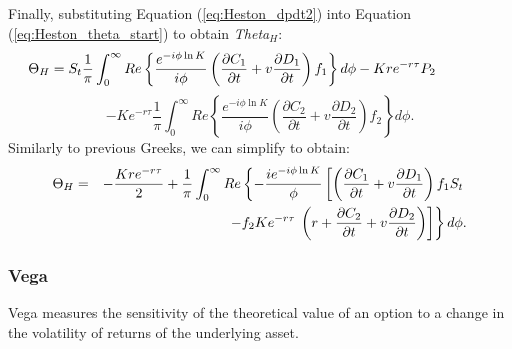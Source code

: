 \documentclass[a4paper]{article}
\begin{document}
Finally, substituting Equation (\ref{eq:Heston_dpdt2}) into Equation (\ref{eq:Heston_theta_start}) to obtain \textit{Theta$_H$}:
\begin{equation*}
	\hspace{-40pt} \Theta_H = S_t \frac{1}{\pi}\int_0^{\infty} Re \left\{ \frac{e^{-i\phi \ln K}}{i\phi} \left( \frac{\partial C_1}{\partial t} + v\frac{\partial D_1}{\partial t} \right) f_1 \right\} d\phi - Kre^{-r\tau}P_2
\end{equation*}
\begin{equation}
	- Ke^{-r\tau} \frac{1}{\pi}\int_0^{\infty} Re \left\{ \frac{e^{-i\phi \ln K}}{i\phi} \left( \frac{\partial C_2}{\partial t} + v\frac{\partial D_2}{\partial t} \right) f_2 \right\} d\phi.
\end{equation}
Similarly to previous Greeks, we can simplify to obtain:
\begin{eqnarray}
	\Theta_H &  = & -\frac{Kre^{-r\tau}}{2} +\frac{1}{\pi} \int_0^\infty Re \left\{-\frac{ie^{-i\phi \ln K}}{\phi} \left[ \left( \frac{\partial C_1}{\partial t} + v\frac{\partial D_1}{\partial t} \right ) f_1S_t\right. \right. \notag\\
	&  & - f_2Ke^{-r\tau}\left. \left.  \left(r + \frac{\partial C_2}{\partial t} + v\frac{\partial D_2}{\partial t} \right ) \right] \right\} d\phi.
\end{eqnarray}



\subsubsection*{Vega}

Vega measures the sensitivity of the theoretical value of an option to a change in the volatility of returns of the underlying asset.
\end{document}
